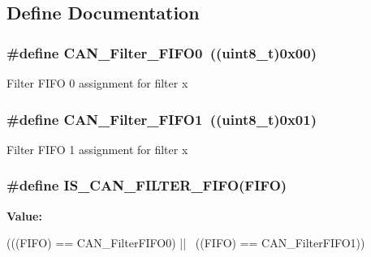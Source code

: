 \subsection{Define Documentation}
\hypertarget{group__CAN__filter__FIFO_ga8249c27978ca94676530540b88a6be8f}{
\subsubsection[{CAN\_\-Filter\_\-FIFO0}]{\setlength{\rightskip}{0pt plus 5cm}\#define CAN\_\-Filter\_\-FIFO0~((uint8\_\-t)0x00)}}
\label{group__CAN__filter__FIFO_ga8249c27978ca94676530540b88a6be8f}
Filter FIFO 0 assignment for filter x \hypertarget{group__CAN__filter__FIFO_gaab8478c89a607c4b8baf68efc730e316}{
\subsubsection[{CAN\_\-Filter\_\-FIFO1}]{\setlength{\rightskip}{0pt plus 5cm}\#define CAN\_\-Filter\_\-FIFO1~((uint8\_\-t)0x01)}}
\label{group__CAN__filter__FIFO_gaab8478c89a607c4b8baf68efc730e316}
Filter FIFO 1 assignment for filter x \hypertarget{group__CAN__filter__FIFO_ga2df5ae0de841fc80c969e9147991ec9d}{
\subsubsection[{IS\_\-CAN\_\-FILTER\_\-FIFO}]{\setlength{\rightskip}{0pt plus 5cm}\#define IS\_\-CAN\_\-FILTER\_\-FIFO(FIFO)}}
\label{group__CAN__filter__FIFO_ga2df5ae0de841fc80c969e9147991ec9d}
{\bfseries Value:}
\begin{DoxyCode}
(((FIFO) == CAN_FilterFIFO0) || \
                                  ((FIFO) == CAN_FilterFIFO1))
\end{DoxyCode}

